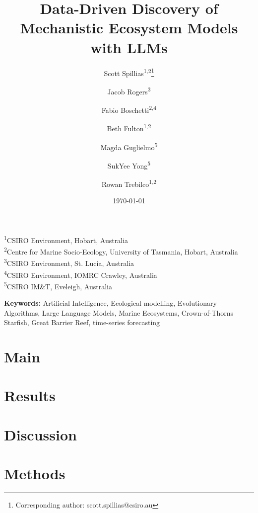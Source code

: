 \documentclass[12pt,a4paper]{article}
\title{Data-Driven Discovery of Mechanistic Ecosystem Models with LLMs}
\author{Scott Spillias\orcidlink{0000-0002-1310-5202}\textsuperscript{1,2}\thanks{Corresponding author: scott.spillias@csiro.au} \and
Jacob Rogers\orcidlink{0000-0002-4724-2555}\textsuperscript{3} \and
Fabio Boschetti\orcidlink{0000-0001-8999-6913}\textsuperscript{2,4} \and
Beth Fulton\orcidlink{0000-0002-5904-7917}\textsuperscript{1,2} \and
Magda Guglielmo\orcidlink{0000-0002-2800-0657}\textsuperscript{5} \and
SukYee Yong\orcidlink{0000-0002-5204-2902}\textsuperscript{5} \and
Rowan Trebilco\orcidlink{0000-0001-9712-8016}\textsuperscript{1,2}
}
\date{\today}
\newcommand{\keywords}{%
Artificial Intelligence,
Ecological modelling,
Evolutionary Algorithms,
Large Language Models,
Marine Ecosystems,
Crown-of-Thorns Starfish,
Great Barrier Reef,
time-series forecasting%
}
\newcommand{\affiliations}{
\noindent\textsuperscript{1}CSIRO Environment, Hobart, Australia\\
\textsuperscript{2}Centre for Marine Socio-Ecology, University of Tasmania, Hobart, Australia\\
\textsuperscript{3}CSIRO Environment, St. Lucia, Australia\\
\textsuperscript{4}CSIRO Environment, IOMRC Crawley, Australia\\
\textsuperscript{5}CSIRO IM\&T, Eveleigh, Australia\\
}
\begin{document}
\setcounter{secnumdepth}{0} %
\maketitle
\affiliations
\vspace{1em}

\noindent\textbf{Keywords:} \keywords
\vspace{2em}
\newpage


\section*{Main}

\section*{Results}

\section*{Discussion}

\clearpage
\section*{Methods}







\clearpage
\appendix
\setcounter{secnumdepth}{3} %

\end{document}
